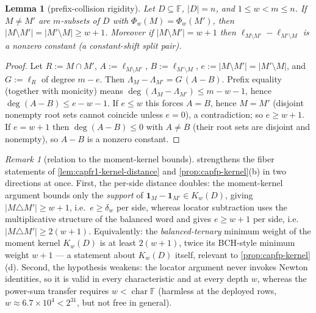 \documentclass[11pt]{article}
\newtheorem{lemma}[lemma]{Lemma}
\theoremstyle{definition}
\theoremstyle{remark}
\newtheorem{remark}[remark]{Remark}
\newcommand{\F}{\mathbb{F}}
\begin{document}
\begin{lemma}[prefix-collision rigidity]\label{lem:capg-prefix-rigidity}
Let $D\subseteq\F$, $|D|=n$, and $1\leq w<m\leq n$.  If $M\neq M'$ are
$m$-subsets of $D$ with $\Phi_w(M)=\Phi_w(M')$, then
$|M\setminus M'|=|M'\setminus M|\geq w+1$.  Moreover if
$|M\setminus M'|=w+1$ then
$\ell_{M\setminus M'}-\ell_{M'\setminus M}$ is a nonzero constant
(a \emph{constant-shift split pair}).
\end{lemma}

\begin{proof}
Let $R:=M\cap M'$, $A:=\ell_{M\setminus M'}$, $B:=\ell_{M'\setminus M}$,
$e:=|M\setminus M'|=|M'\setminus M|$, and $G:=\ell_R$ of degree $m-e$.  Then
$\Lambda_M-\Lambda_{M'}=G\,(A-B)$.  Prefix equality (together with
monicity) means $\deg(\Lambda_M-\Lambda_{M'})\leq m-w-1$, hence
$\deg(A-B)\leq e-w-1$.  If $e\leq w$ this forces $A=B$, hence $M=M'$
(disjoint nonempty root sets cannot coincide unless $e=0$), a
contradiction; so $e\geq w+1$.  If $e=w+1$ then $\deg(A-B)\leq 0$ with
$A\neq B$ (their root sets are disjoint and nonempty), so $A-B$ is a
nonzero constant.
\end{proof}

\begin{remark}[relation to the moment-kernel bounds]
\label{rem:capg-rigidcompare}
 strengthens the fiber statements of
\cref{lem:capfr1-kernel-distance} and \cref{prop:capfp-kernel}\textup{(b)}
in two directions at once.  First, the per-side distance doubles: the
moment-kernel argument bounds only the \emph{support} of
$\mathbf 1_M-\mathbf 1_{M'}\in K_w(D)$, giving $|M\triangle M'|\ge w+1$,
i.e.\ $e\ge\delta_w$ per side, whereas locator subtraction uses the
multiplicative structure of the balanced word and gives $e\ge w+1$ per
side, i.e.\ $|M\triangle M'|\ge2(w+1)$.  Equivalently: the
\emph{balanced-ternary} minimum weight of the moment kernel $K_w(D)$ is
at least $2(w+1)$, twice its BCH-style minimum weight $w+1$ --- a
statement about $K_w(D)$ itself, relevant to
\cref{prop:capfp-kernel}\textup{(d)}.  Second, the hypothesis weakens: the
locator argument never invokes Newton identities, so it is valid in every
characteristic and at every depth $w$, whereas the power-sum transfer
requires $w<\operatorname{char}\F$ (harmless at the deployed rows,
$w\approx6.7\times10^4<2^{31}$, but not free in general).
\end{remark}
\end{document}
